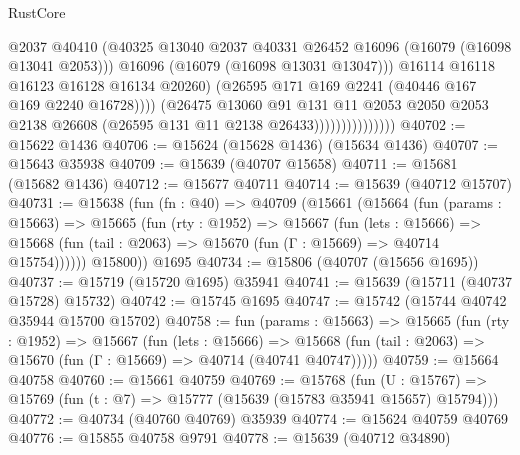\begin{lexlean}{RustCore}
\begin{coremodule}
                                      @2037
                                      @40410
                                      (@40325
                                        @13040
                                        @2037
                                        @40331
                                        @26452
                                        @16096
                                        (@16079 (@16098 @13041 @2053)))
                                      @16096
                                      (@16079 (@16098 @13031 @13047)))
                                    @16114
                                    @16118
                                    @16123
                                    @16128
                                    @16134
                                    @20260)
                                  (@26595 @171 @169 @2241 (@40446 @167 @169 @2240 @16728))))
                              (@26475
                                @13060
                                @91
                                @131
                                @11
                                @2053
                                @2050
                                @2053
                                @2138
                                @26608
                                (@26595 @131 @11 @2138 @26433)))))))))))))))
@40702 := @15622 @1436
@40706 := @15624 (@15628 @1436) (@15634 @1436)
@40707 := @15643 @35938
@40709 := @15639 (@40707 @15658)
@40711 := @15681 (@15682 @1436)
@40712 := @15677 @40711
@40714 := @15639 (@40712 @15707)
@40731 := @15638
    (fun (fn : @40) =>
    @40709
      (@15661
        (@15664
          (fun (params : @15663) =>
          @15665
            (fun (rty : @1952) =>
            @15667
              (fun (lets : @15666) =>
              @15668 (fun (tail : @2063) => @15670 (fun (Γ : @15669) => @40714 @15754))))))
        @15800))
    @1695
@40734 := @15806 (@40707 (@15656 @1695))
@40737 := @15719 (@15720 @1695) @35941
@40741 := @15639 (@15711 (@40737 @15728) @15732)
@40742 := @15745 @1695
@40747 := @15742 (@15744 @40742 @35944 @15700 @15702)
@40758 := fun (params : @15663) =>
  @15665
    (fun (rty : @1952) =>
    @15667
      (fun (lets : @15666) =>
      @15668 (fun (tail : @2063) => @15670 (fun (Γ : @15669) => @40714 (@40741 @40747)))))
@40759 := @15664 @40758
@40760 := @15661 @40759
@40769 := @15768
    (fun (U : @15767) => @15769 (fun (t : @7) => @15777 (@15639 (@15783 @35941 @15657) @15794)))
@40772 := @40734 (@40760 @40769) @35939
@40774 := @15624 @40759 @40769
@40776 := @15855 @40758 @9791
@40778 := @15639 (@40712 @34890)

\end{coremodule}
\end{lexlean}
